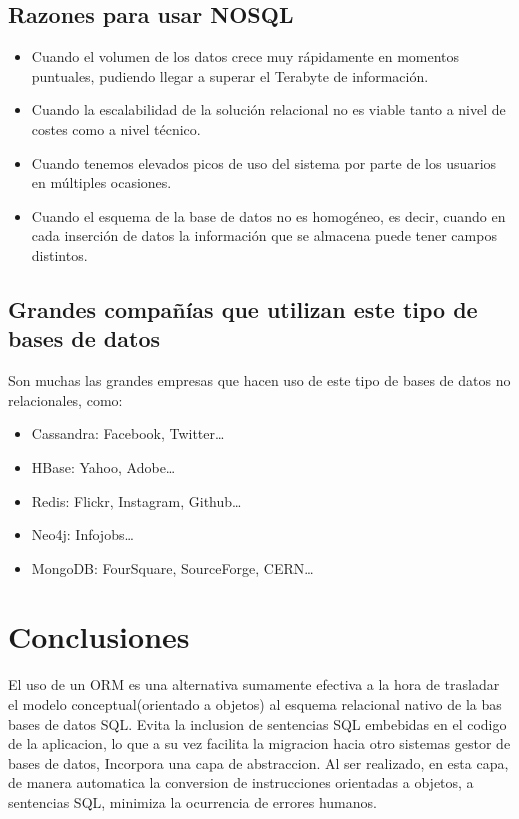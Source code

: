 \documentclass[twoside,twocolumn]{article}
\begin{document}
\subsection{Razones para usar NOSQL}
\begin{itemize}
    \item   Cuando el volumen de los datos crece muy rápidamente en momentos puntuales, pudiendo llegar a superar el Terabyte de información. 
    \item	Cuando la escalabilidad de la solución relacional no es viable tanto a nivel de costes como a nivel técnico. 
    \item	Cuando tenemos elevados picos de uso del sistema por parte de los usuarios en múltiples ocasiones. 
    \item	Cuando el esquema de la base de datos no es homogéneo, es decir, cuando en cada inserción de datos la información que se almacena puede tener campos distintos.
    
\end{itemize}
\subsection{Grandes compañías que utilizan este tipo de bases de datos}
Son muchas las grandes empresas que hacen uso de este tipo de bases de datos no relacionales, como: 
\begin{itemize}
    \item   Cassandra: Facebook, Twitter… 
    \item	HBase: Yahoo, Adobe… 
    \item	Redis: Flickr, Instagram, Github… 
    \item	Neo4j: Infojobs… 
    \item	MongoDB: FourSquare, SourceForge, CERN…
    
\end{itemize}


\section{Conclusiones}
El uso de un ORM es una alternativa sumamente efectiva a la hora de trasladar el modelo conceptual(orientado a objetos)
al esquema relacional nativo de la bas bases de datos SQL. Evita la inclusion de sentencias SQL embebidas en el codigo de la aplicacion, lo que a su vez facilita la migracion
hacia otro sistemas gestor de bases de datos, Incorpora una capa de abstraccion. Al ser realizado, en esta capa, de manera automatica la conversion de 
instrucciones orientadas a objetos, a sentencias SQL, minimiza la ocurrencia de errores humanos.
\end{document}
